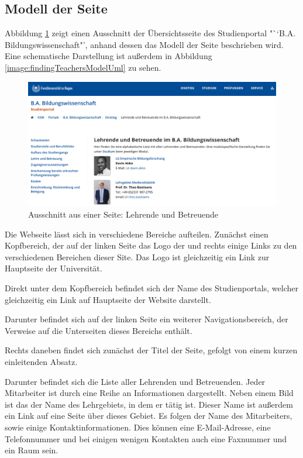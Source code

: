 \subsection{Modell der Seite}
    Abbildung \ref{image:findingTeachersModelOverview} zeigt einen
    Ausschnitt der Übersichtsseite des Studienportal "``B.A. Bildungswissenschaft"',
    anhand dessen das Modell der Seite beschrieben wird.
    Eine schematische Darstellung ist außerdem in Abbildung
    \ref{image:findingTeachersModelUml} zu sehen.

    \begin{figure}[htb]
        \centering
        \includegraphics[width=\textwidth]{../resources/findings/case-study-1/model/overview.png}
        \caption{Ausschnitt aus einer Seite: Lehrende und Betreuende}
        \label{image:findingTeachersModelOverview}
    \end{figure}

    Die Webseite lässt sich in verschiedene Bereiche aufteilen.
    Zunächst einen Kopfbereich, der auf der linken Seite das Logo
    der {\fernUni} und rechts einige Links zu den verschiedenen
    Bereichen dieser Site.
    Das Logo ist gleichzeitig ein Link zur Hauptseite der Universität.

    Direkt unter dem Kopfbereich befindet sich der Name des Studienportals,
    welcher gleichzeitig ein Link auf Hauptseite der Website darstellt.

    Darunter befindet sich auf der linken Seite ein weiterer Navigationsbereich,
    der Verweise auf die Unterseiten dieses Bereichs enthält.

    Rechts daneben findet sich zunächst der Titel der Seite,
    gefolgt von einem kurzen einleitenden Absatz.

    Darunter befindet sich die Liste aller Lehrenden und Betreuenden.
    Jeder Mitarbeiter ist durch eine Reihe an Informationen dargestellt.
    Neben einem Bild ist das der Name des Lehrgebiets, in dem er tätig ist.
    Dieser Name ist außerdem ein Link auf eine Seite über dieses Gebiet.
    Es folgen der Name des Mitarbeiters,
    sowie einige Kontaktinformationen.
    Dies können eine E-Mail-Adresse, eine Telefonnummer
    und bei einigen wenigen Kontakten auch eine Faxnummer und ein Raum sein.

